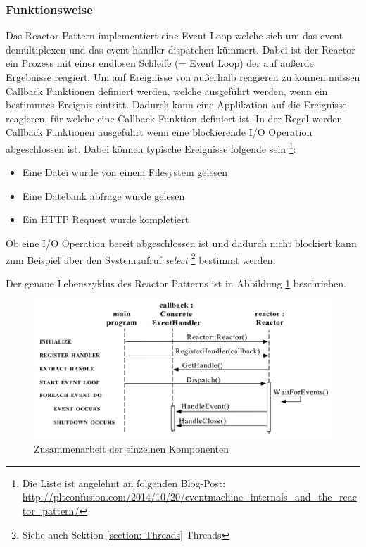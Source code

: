\subsubsection{Funktionsweise}

Das Reactor Pattern implementiert eine Event Loop welche sich um das event demultiplexen und das event handler dispatchen kümmert. Dabei ist der Reactor ein Prozess mit einer endlosen Schleife (= Event Loop) der auf äußerde Ergebnisse reagiert. Um auf Ereignisse von außerhalb reagieren zu können müssen Callback Funktionen definiert werden, welche ausgeführt werden, wenn ein bestimmtes Ereignis eintritt. Dadurch kann eine Applikation auf die Ereignisse reagieren, für welche eine Callback Funktion definiert ist. In der Regel werden Callback Funktionen ausgeführt wenn eine blockierende I/O Operation abgeschlossen ist. Dabei können typische Ereignisse folgende sein \footnote{Die Liste ist angelehnt an folgenden Blog-Post: \url{http://pltconfusion.com/2014/10/20/eventmachine_internals_and_the_reactor_pattern/}}:

\begin{itemize}
  \item Eine Datei wurde von einem Filesystem gelesen
  \item Eine Datebank abfrage wurde gelesen
  \item Ein HTTP Request wurde kompletiert
\end{itemize}

Ob eine I/O Operation bereit abgeschlossen ist und dadurch nicht blockiert kann zum Beispiel über den Systemaufruf \emph{select} \footnote{Siehe auch Sektion \ref{section: Threads} Threads} bestimmt werden.

Der genaue Lebenszyklus des Reactor Patterns ist in Abbildung \ref{figure:reactor_cycle} beschrieben.

\begin{figure}[!htb]
  \centering
  \includegraphics[width=13cm]{images/reactor.png}
  \caption{
    Zusammenarbeit der einzelnen Komponenten \cite[p. 5]{Sch95}
  }
  \label{figure:reactor_cycle}
\end{figure}

